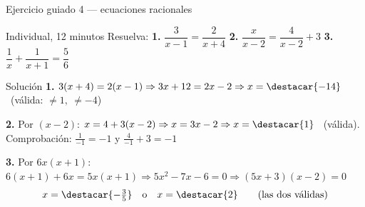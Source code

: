 \documentclass[aspectratio=169,10pt]{beamer}
\begin{document}
\begin{frame}{Ejercicio guiado 4 — ecuaciones racionales}
  \scriptsize
  \begin{alertblock}{Individual, 12 minutos}
    \tiny
    Resuelva: \quad
    \textbf{1.} $\dfrac{3}{x-1}=\dfrac{2}{x+4}$ \qquad
    \textbf{2.} $\dfrac{x}{x-2}=\dfrac{4}{x-2}+3$ \qquad
    \textbf{3.} $\dfrac{1}{x}+\dfrac{1}{x+1}=\dfrac{5}{6}$
  \end{alertblock}

  \vspace{0.04cm}
  \begin{block}{Solución}
    \tiny
    \textbf{1.} $3(x+4)=2(x-1) \Rightarrow 3x+12=2x-2 \Rightarrow
    x=\destacar{-14}$ \ (válida: $\neq 1,\ \neq -4$)

    \vspace{0.08cm}
    \textbf{2.} Por $(x-2)$: $x = 4+3(x-2) \Rightarrow x = 3x-2
    \Rightarrow x=\destacar{1}$ \ (válida). Comprobación:
    $\frac{1}{-1}=-1$ y $\frac{4}{-1}+3=-1$ \checkmark

    \vspace{0.05cm}
    \textbf{3.} Por $6x(x+1)$: $6(x+1)+6x=5x(x+1) \Rightarrow
    5x^{2}-7x-6=0 \Rightarrow (5x+3)(x-2)=0$
    \[ x=\destacar{-\tfrac{3}{5}} \quad\text{o}\quad x=\destacar{2}
       \qquad \text{(las dos válidas)} \]
  \end{block}
\end{frame}

\end{document}
